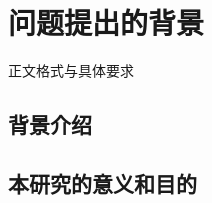 \section{问题提出的背景}

\par 正文格式与具体要求\autocite{zjuthesisrules}

\subsection{背景介绍}

\subsection{本研究的意义和目的}
